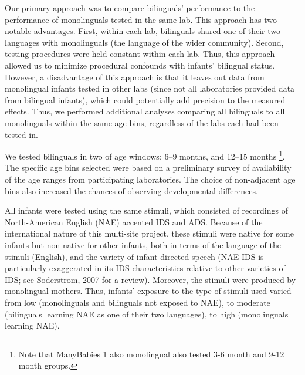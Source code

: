 \documentclass[,man,floatsintext]{apa6}
\begin{document}
Our primary approach was to compare bilinguals' performance to the performance of monolinguals tested in the same lab. This approach has two notable advantages. First, within each lab, bilinguals shared one of their two languages with monolinguals (the language of the wider community). Second, testing procedures were held constant within each lab. Thus, this approach allowed us to minimize procedural confounds with infants' bilingual status. However, a disadvantage of this approach is that it leaves out data from monolingual infants tested in other labs (since not all laboratories provided data from bilingual infants), which could potentially add precision to the measured effects. Thus, we performed additional analyses comparing all bilinguals to all monolinguals within the same age bins, regardless of the labs each had been tested in.

We tested bilinguals in two of age windows: 6--9 months, and 12--15 months \footnote{Note that ManyBabies 1 also monolingual also tested 3-6 month and 9-12 month groups.}. The specific age bins selected were based on a preliminary survey of availability of the age ranges from participating laboratories. The choice of non-adjacent age bins also increased the chances of observing developmental differences.

All infants were tested using the same stimuli, which consisted of recordings of North-American English (NAE) accented IDS and ADS. Because of the international nature of this multi-site project, these stimuli were native for some infants but non-native for other infants, both in terms of the language of the stimuli (English), and the variety of infant-directed speech (NAE-IDS is particularly exaggerated in its IDS characteristics relative to other varieties of IDS; see Soderstrom, 2007 for a review). Moreover, the stimuli were produced by monolingual mothers. Thus, infants' exposure to the type of stimuli used varied from low (monolinguals and bilinguals not exposed to NAE), to moderate (bilinguals learning NAE as one of their two languages), to high (monolinguals learning NAE).
\end{document}
